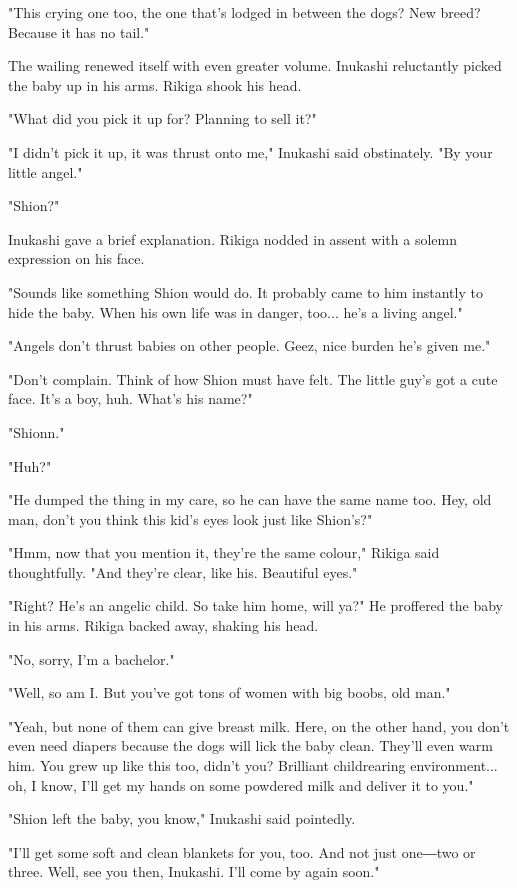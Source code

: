 "This crying one too, the one that's lodged in between the dogs? New
breed? Because it has no tail."

The wailing renewed itself with even greater volume. Inukashi
reluctantly picked the baby up in his arms. Rikiga shook his head.

"What did you pick it up for? Planning to sell it?"

"I didn't pick it up, it was thrust onto me," Inukashi said obstinately.
"By your little angel."

"Shion?"

Inukashi gave a brief explanation. Rikiga nodded in assent with a solemn
expression on his face.

"Sounds like something Shion would do. It probably came to him instantly
to hide the baby. When his own life was in danger, too... he's a living
angel."

"Angels don't thrust babies on other people. Geez, nice burden he's
given me."

"Don't complain. Think of how Shion must have felt. The little guy's got
a cute face. It's a boy, huh. What's his name?"

"Shionn."

"Huh?"

"He dumped the thing in my care, so he can have the same name too. Hey,
old man, don't you think this kid's eyes look just like Shion's?"

"Hmm, now that you mention it, they're the same colour," Rikiga said
thoughtfully. "And they're clear, like his. Beautiful eyes."

"Right? He's an angelic child. So take him home, will ya?" He proffered
the baby in his arms. Rikiga backed away, shaking his head.

"No, sorry, I'm a bachelor."

"Well, so am I. But you've got tons of women with big boobs, old man."

"Yeah, but none of them can give breast milk. Here, on the other hand,
you don't even need diapers because the dogs will lick the baby clean.
They'll even warm him. You grew up like this too, didn't you? Brilliant
childrearing environment... oh, I know, I'll get my hands on some
powdered milk and deliver it to you."

"Shion left the baby, you know," Inukashi said pointedly.

"I'll get some soft and clean blankets for you, too. And not just
one―two or three. Well, see you then, Inukashi. I'll come by again
soon."

